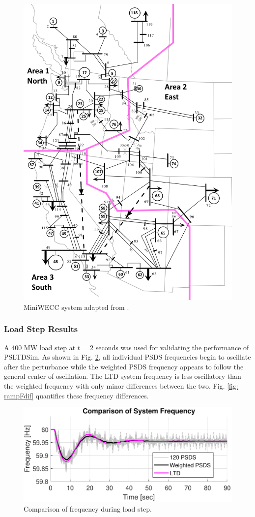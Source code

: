 \begin{figure}[!ht]
	\centering
	\includegraphics[width=.65\linewidth]{figures/miniWECC_split03}
	\caption{MiniWECC system adapted from \cite{trudnowski2012}.}
	\label{fig: miniWECC}
\end{figure}

\subsubsection{Load Step Results}
A 400 MW load step at $t$ = 2 seconds was used for validating the performance of PSLTDSim.
As shown in Fig. \ref{fig: stepFcomp}, all individual PSDS frequencies begin to oscillate after the perturbance while the weighted PSDS frequency appears to follow the general center of oscillation. The LTD system frequency is less oscillatory than the weighted frequency with only minor differences between the two. Fig. \ref{fig: rampFdif} quantifies these frequency differences.

\begin{figure}[!t]
	\centering
	\includegraphics[width=\linewidth]{figures/miniWECC3ALTDstepF3}
	\caption{Comparison of frequency during load step.}
	\label{fig: stepFcomp}
\end{figure}

